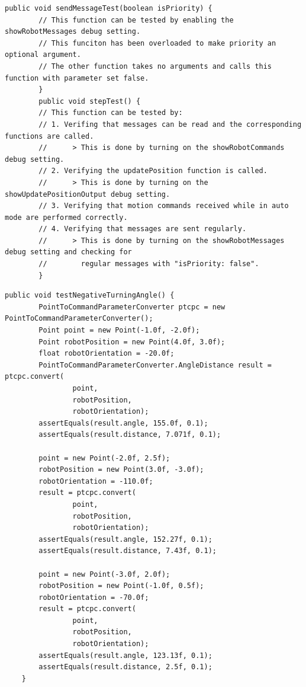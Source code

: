 \documentclass[12pt,a4paper]{article}
\begin{document}
	\begin{lstlisting}[caption=Robot message manual test suite, captionpos=b, label={lst:RobotMessageManualTestSuite}]
	public void sendMessageTest(boolean isPriority) {
        // This function can be tested by enabling the showRobotMessages debug setting.
        // This funciton has been overloaded to make priority an optional argument. 
        // The other function takes no arguments and calls this function with parameter set false.
        }
        public void stepTest() {
        // This function can be tested by:
        // 1. Verifing that messages can be read and the corresponding functions are called. 
        //      > This is done by turning on the showRobotCommands debug setting.
        // 2. Verifying the updatePosition function is called.
        //      > This is done by turning on the showUpdatePositionOutput debug setting.
        // 3. Verifying that motion commands received while in auto mode are performed correctly.
        // 4. Verifying that messages are sent regularly.
        //      > This is done by turning on the showRobotMessages debug setting and checking for 
        //        regular messages with "isPriority: false".
        }
	\end{lstlisting}
	\begin{lstlisting}[caption=PointToCommandParameter negative angle test suite,captionpos=b,label={lst:PointToCommandParameterNegativeAngleTestSuite}]
	public void testNegativeTurningAngle() {
		PointToCommandParameterConverter ptcpc = new PointToCommandParameterConverter();
		Point point = new Point(-1.0f, -2.0f);
		Point robotPosition = new Point(4.0f, 3.0f);
		float robotOrientation = -20.0f;
		PointToCommandParameterConverter.AngleDistance result = ptcpc.convert(
				point, 
				robotPosition, 
				robotOrientation);
		assertEquals(result.angle, 155.0f, 0.1);
		assertEquals(result.distance, 7.071f, 0.1);
		
		point = new Point(-2.0f, 2.5f);
		robotPosition = new Point(3.0f, -3.0f);
		robotOrientation = -110.0f;
		result = ptcpc.convert(
				point, 
				robotPosition, 
				robotOrientation);
		assertEquals(result.angle, 152.27f, 0.1);
		assertEquals(result.distance, 7.43f, 0.1);
		
		point = new Point(-3.0f, 2.0f);
		robotPosition = new Point(-1.0f, 0.5f);
		robotOrientation = -70.0f;
		result = ptcpc.convert(
				point, 
				robotPosition, 
				robotOrientation);
		assertEquals(result.angle, 123.13f, 0.1);
		assertEquals(result.distance, 2.5f, 0.1);
	}
	\end{lstlisting}
\end{document}
